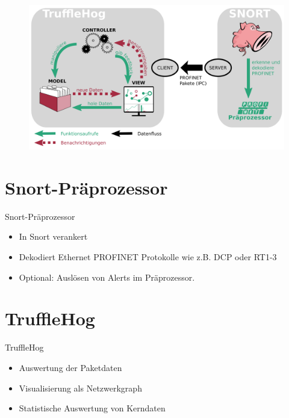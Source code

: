 \documentclass[18pt]{beamer}
\begin{document}
\begin{frame}
    \begin{figure}
    	\centering
    	\includegraphics[width=\textwidth]{./images/jan_12.png}
    \end{figure}
\end{frame}


\section{Snort-Präprozessor}
\begin{frame}{Snort-Präprozessor}
    \begin{itemize}
      \item In Snort verankert
      \pause
      \item Dekodiert Ethernet PROFINET Protokolle wie z.B. DCP oder RT1-3
      \pause
      \item Optional: Auslösen von Alerts im Präprozessor.
    \end{itemize}
\end{frame}


\section{TruffleHog}
\begin{frame}{TruffleHog}
    \begin{itemize}
      \item Auswertung der Paketdaten
      \pause
      \item Visualisierung als Netzwerkgraph
      \pause
	  \item Statistische Auswertung von Kerndaten
    \end{itemize}
\end{frame}
\end{document}
